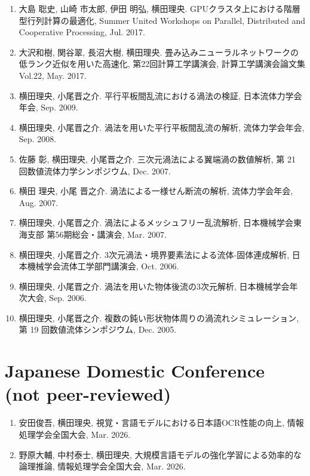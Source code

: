 \documentclass[margin,line]{cv}
\begin{document}
\begin{resume}
\begin{enumerate}
\item 大島 聡史, 山崎 市太郎, 伊田 明弘, 横田理央. GPUクラスタ上における階層型行列計算の最適化, Summer United Workshops on Parallel, Distributed and Cooperative Processing, Jul. 2017.

\item 大沢和樹, 関谷翠, 長沼大樹, 横田理央. 畳み込みニューラルネットワークの低ランク近似を用いた高速化, 第22回計算工学講演会, 計算工学講演会論文集 Vol.22, May. 2017.

\item 横田理央, 小尾晋之介. 平行平板間乱流における渦法の検証, 日本流体力学会年会, Sep. 2009.

\item 横田理央, 小尾晋之介. 渦法を用いた平行平板間乱流の解析, 流体力学会年会, Sep. 2008.

\item 佐藤 彰, 横田理央, 小尾晋之介. 三次元渦法による翼端渦の数値解析, 第 21 回数値流体力学シンポジウム, Dec. 2007.

\item 横田 理央, 小尾 晋之介. 渦法による一様せん断流の解析, 流体力学会年会, Aug. 2007.

\item 横田理央, 小尾晋之介. 渦法によるメッシュフリー乱流解析, 日本機械学会東海支部 第56期総会・講演会, Mar. 2007.

\item 横田理央, 小尾晋之介. 3次元渦法・境界要素法による流体-固体連成解析, 日本機械学会流体工学部門講演会, Oct. 2006.

\item 横田理央, 小尾晋之介. 渦法を用いた物体後流の3次元解析, 日本機械学会年次大会, Sep. 2006.

\item 横田理央, 小尾晋之介. 複数の鈍い形状物体周りの渦流れシミュレーション, 第 19 回数値流体シンポジウム, Dec. 2005.
\end{enumerate}

\section{\sc Japanese Domestic Conference (not peer-reviewed)}
\begin{enumerate}
\item 安田俊吾, 横田理央, 視覚・言語モデルにおける日本語OCR性能の向上, 情報処理学会全国大会, Mar. 2026.

\item 野原大輔, 中村泰士, 横田理央, 大規模言語モデルの強化学習による効率的な論理推論, 情報処理学会全国大会, Mar. 2026.


\end{enumerate}
\end{resume}
\end{document}
